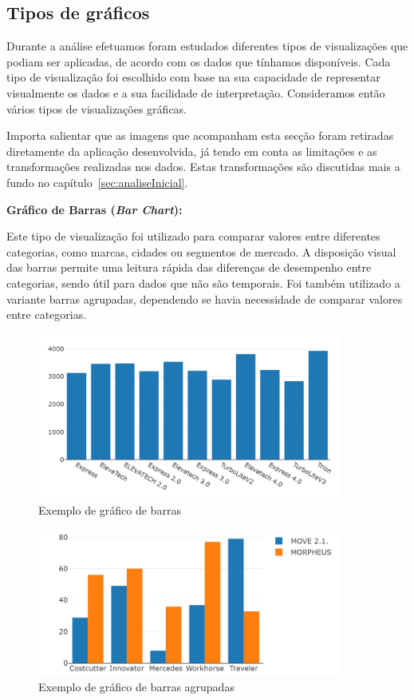 \subsection{Tipos de gráficos}

Durante a análise efetuamos foram estudados diferentes tipos de visualizações que podiam ser aplicadas, de acordo com os dados que tínhamos disponíveis. Cada tipo de visualização foi escolhido com base na sua capacidade de representar visualmente os dados e a sua facilidade de interpretação.  Consideramos então vários tipos de visualizações gráficas. 

Importa salientar que as imagens que acompanham esta secção foram retiradas diretamente da aplicação desenvolvida, já tendo em conta as limitações e as transformações realizadas nos dados. Estas transformações são discutidas mais a fundo no capítulo~\ref{sec:analiseInicial}.

\textbf{Gráfico de Barras (\textit{Bar Chart}):}

Este tipo de visualização foi utilizado para comparar valores entre diferentes categorias, como marcas, cidades ou segmentos de mercado. A disposição visual das barras permite uma leitura rápida das diferenças de desempenho entre categorias, sendo útil para dados que não são temporais. Foi também utilizado a variante barras agrupadas, dependendo se havia necessidade de comparar valores entre categorias.


\begin{figure}[H]
\centering
\includegraphics[max width=10cm]{./img/barras1}
\caption{Exemplo de gráfico de barras}
\end{figure}

\begin{figure}[H]
\centering
\includegraphics[max width=10cm]{./img/agrupada}
\caption{Exemplo de gráfico de barras agrupadas}
\end{figure}

